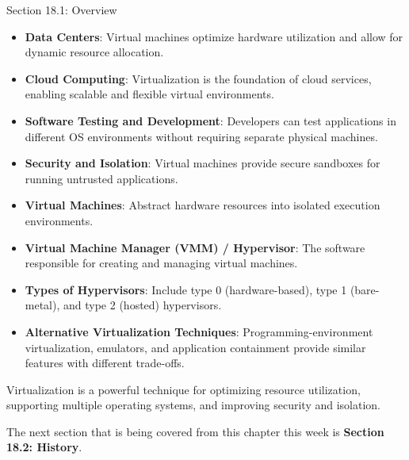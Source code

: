 \begin{notes}{Section 18.1: Overview}
    \begin{highlight}
    
        \begin{itemize}
            \item \textbf{Data Centers}: Virtual machines optimize hardware utilization and allow for dynamic resource allocation.
            \item \textbf{Cloud Computing}: Virtualization is the foundation of cloud services, enabling scalable and flexible virtual environments.
            \item \textbf{Software Testing and Development}: Developers can test applications in different OS environments without requiring separate physical machines.
            \item \textbf{Security and Isolation}: Virtual machines provide secure sandboxes for running untrusted applications.
        \end{itemize}
    
    \end{highlight}
    
    \begin{highlight}
    
        \begin{itemize}
            \item \textbf{Virtual Machines}: Abstract hardware resources into isolated execution environments.
            \item \textbf{Virtual Machine Manager (VMM) / Hypervisor}: The software responsible for creating and managing virtual machines.
            \item \textbf{Types of Hypervisors}: Include type 0 (hardware-based), type 1 (bare-metal), and type 2 (hosted) hypervisors.
            \item \textbf{Alternative Virtualization Techniques}: Programming-environment virtualization, emulators, and application containment provide similar features with different trade-offs.
        \end{itemize}
    
    Virtualization is a powerful technique for optimizing resource utilization, supporting multiple operating systems, and improving security and isolation.
    
    \end{highlight}
\end{notes}

The next section that is being covered from this chapter this week is \textbf{Section 18.2: History}.

